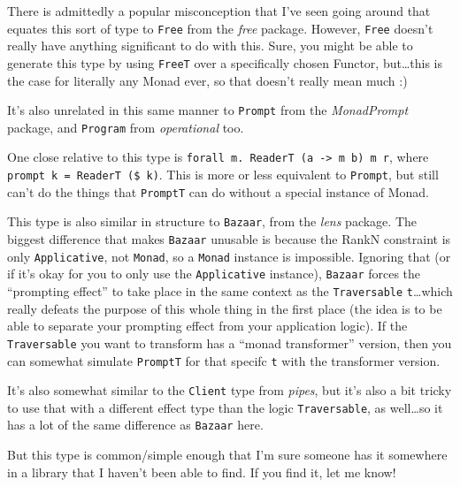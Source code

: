 \documentclass[]{article}
\begin{document}
There is admittedly a popular misconception that I've seen going around
that equates this sort of type to \texttt{Free} from the \emph{free}
package. However, \texttt{Free} doesn't really have anything significant
to do with this. Sure, you might be able to generate this type by using
\texttt{FreeT} over a specifically chosen Functor, but\ldots{}this is
the case for literally any Monad ever, so that doesn't really mean much
:)

It's also unrelated in this same manner to \texttt{Prompt} from the
\emph{MonadPrompt} package, and \texttt{Program} from \emph{operational}
too.

One close relative to this type is
\texttt{forall\ m.\ ReaderT\ (a\ -\textgreater{}\ m\ b)\ m\ r}, where
\texttt{prompt\ k\ =\ ReaderT\ (\$\ k)}. This is more or less equivalent
to \texttt{Prompt}, but still can't do the things that \texttt{PromptT}
can do without a special instance of Monad.

This type is also similar in structure to \texttt{Bazaar}, from the
\emph{lens} package. The biggest difference that makes \texttt{Bazaar}
unusable is because the RankN constraint is only \texttt{Applicative},
not \texttt{Monad}, so a \texttt{Monad} instance is impossible. Ignoring
that (or if it's okay for you to only use the \texttt{Applicative}
instance), \texttt{Bazaar} forces the ``prompting effect'' to take place
in the same context as the \texttt{Traversable} \texttt{t}\ldots{}which
really defeats the purpose of this whole thing in the first place (the
idea is to be able to separate your prompting effect from your
application logic). If the \texttt{Traversable} you want to transform
has a ``monad transformer'' version, then you can somewhat simulate
\texttt{PromptT} for that specifc \texttt{t} with the transformer
version.

It's also somewhat similar to the \texttt{Client} type from
\emph{pipes}, but it's also a bit tricky to use that with a different
effect type than the logic \texttt{Traversable}, as well\ldots{}so it
has a lot of the same difference as \texttt{Bazaar} here.

But this type is common/simple enough that I'm sure someone has it
somewhere in a library that I haven't been able to find. If you find it,
let me know!
\end{document}
